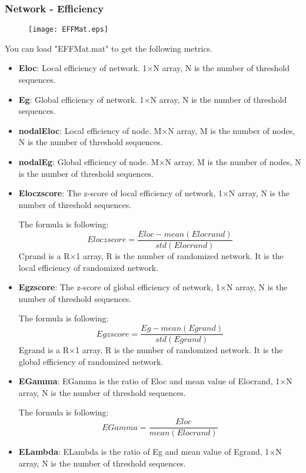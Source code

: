 \documentclass[11pt]{article}
\begin{document}
			\subsubsection{Network - Efficiency}
				\begin{figure}
					\begin{center}
						\texttt{[image: EFFMat.eps]}
					\end{center}
				\end{figure}
				You can load "EFFMat.mat" to get the following metrics.
				\begin{itemize}
					\item \textbf{Eloc}: Local efficiency of network.
						1$\times$N array, N is the number of threshold sequences.
					\item \textbf{Eg}: Global efficiency of network.
						1$\times$N array, N is the number of threshold sequences.
					\item \textbf{nodalEloc}: Local efficiency of node.
						M$\times$N array, M is the number of nodes, N is the number of threshold sequences.
					\item \textbf{nodalEg}: Global efficiency of node.
						M$\times$N array, M is the number of nodes, N is the number of threshold sequences.
					\item \textbf{Eloczscore}: The z-score of local efficiency of network, 
						1$\times$N array, N is the number of threshold sequences.

						The formula is following:
						$$Eloczscore=\frac{Eloc-mean(Elocrand)}{std(Elocrand)}$$
						Cprand is a R$\times$1 array, R is the number of randomized network. 
						It is the local efficiency of randomized network.
					\item \textbf{Egzscore}: The z-score of global efficiency of network,
						1$\times$N array, N is the number of threshold sequences.

						The formula is following:
						$$Egzscore=\frac{Eg-mean(Egrand)}{std(Egrand)}$$
						Egrand is a R$\times$1 array, R is the number of randomized network. 
						It is the global efficiency of randomized network.
					\item \textbf{EGamma}: EGamma is the ratio of Eloc and mean value of Elocrand,
						1$\times$N array, N is the number of threshold sequences.
						
						The formula is following:
						$$EGamma=\frac{Eloc}{mean(Elocrand)}$$
					\item \textbf{ELambda}: ELambda is the ratio of Eg and mean value of Egrand,
						1$\times$N array, N is the number of threshold sequences.
						

\end{itemize}
\end{document}
